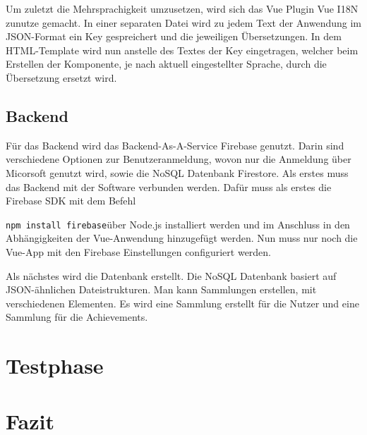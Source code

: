 \documentclass[12pt]{article}
\begin{document}
Um zuletzt die Mehrsprachigkeit umzusetzen, wird sich das Vue Plugin Vue I18N zunutze gemacht.
In einer separaten Datei wird zu jedem Text der Anwendung im JSON-Format ein Key gespreichert und
die jeweiligen Übersetzungen. In dem HTML-Template wird nun anstelle des Textes der Key eingetragen,
welcher beim Erstellen der Komponente, je nach aktuell eingestellter Sprache, durch die Übersetzung
ersetzt wird.



\subsection{Backend}

Für das Backend wird das Backend-As-A-Service Firebase genutzt. Darin sind verschiedene Optionen zur Benutzeranmeldung, 
wovon nur die Anmeldung über Micorsoft genutzt wird, sowie die NoSQL Datenbank Firestore. 
Als erstes muss das Backend mit der Software verbunden werden. Dafür muss als erstes die Firebase SDK mit dem Befehl

\texttt{npm install firebase}\newline über Node.js installiert werden und im Anschluss in den
Abhängigkeiten der Vue-Anwendung hinzugefügt werden.
Nun muss nur noch die Vue-App mit den Firebase Einstellungen configuriert werden.

Als nächstes wird die Datenbank erstellt. Die NoSQL Datenbank basiert auf JSON-ähnlichen
Dateistrukturen. Man kann Sammlungen erstellen, mit verschiedenen Elementen. Es wird eine Sammlung erstellt für die Nutzer
und eine Sammlung für die Achievements. 



%
%

\section{Testphase}



%
%

\section{Fazit}
\end{document}
